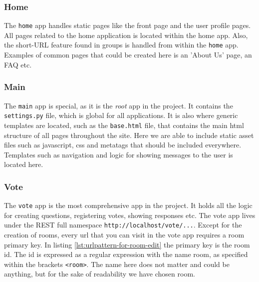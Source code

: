 \subsubsection*{Home} %
The \texttt{home} app handles static pages like the front page and the user profile pages.
All pages related to the home application is located within the home app. Also, the short-URL feature found in groups is handled from within the \texttt{home} app. Examples of common pages that could be created here is an 'About Us' page, an FAQ etc.

\subsubsection*{Main}
The \texttt{main} app is special, as it is the \emph{root} app in the project. It contains the \texttt{settings.py} file, which is global for all applications. It is also where generic templates are located, such as the \texttt{base.html} file, that contains the main html structure of all pages throughout the site. Here we are able to include static asset files such as javascript, css and metatags that should be included everywhere. Templates such as navigation and logic for showing messages to the user is located here.


\subsubsection*{Vote}
The \texttt{vote} app is the most comprehensive app in the project. It holds all the logic for creating questions, registering votes, showing responses etc. The vote app lives under the REST full namespace \texttt{http://localhost/vote/...}. Except for the creation of rooms, every url that you can visit in the vote app requires a room primary key. In listing \ref{lst:urlpattern-for-room-edit} the primary key is the room id. The id is expressed as a regular expression with the name room, as specified within the brackets \texttt{<room>}. The name here does not matter and could be anything, but for the sake of readability we have chosen room.

